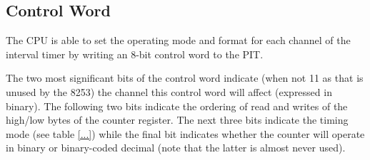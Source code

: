     \subsection{Control Word}
        The CPU is able to set the operating mode and format for each channel of the interval timer by writing an 8-bit control word to the PIT.

        The two most significant bits of the control word indicate (when not 11 as that is unused by the 8253) the channel this control word will affect (expressed in binary). The following two bits indicate the ordering of read and writes of the high/low bytes of the counter register. The next three bits indicate the timing mode (see table \ref{...}) while the final bit indicates whether the counter will operate in binary or binary-coded decimal (note that the latter is almost never used).


